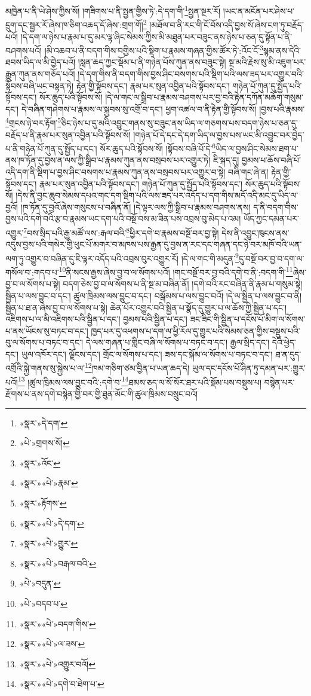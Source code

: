 མཁྱེན་པ་ནི་ཡེ་ཤེས་ཀྱིས་སོ། །གཟིགས་པ་ནི་སྤྱན་གྱིས་ཏེ་:དེ་དག་གི་\footnote{«སྣར་»དེ་དག་}སྤྱན་སྔར་རོ། །ཡང་ན་མངོན་པར་ཤེས་པ་དྲུག་དང་སྦྱར་རོ་ཞེས་ཁ་ཅིག་འཆད་དོ་ཞེས་:གྲག་གོ།\footnote{«པེ་»གྲགས་སོ།} །མཐོལ་བ་ནི་རང་གི་ངོ་བོས་འདི་བྱས་སོ་ཞེས་ངག་ཏུ་བརྗོད་པའོ། །དེ་དག་ལ་ཉེས་པ་རྣམ་པ་དུ་མར་ལྟ་ཞིང་སེམས་ཀྱིས་མི་མཐུན་པར་བཟུང་ནས་ཉེས་པ་ཅན་དུ་སྟོན་པ་ནི་བཤགས་པའོ། །མི་འཆབ་པ་ནི་བདག་གིས་བགྱིས་པའི་སྡིག་པ་རྣམས་གཞན་གྱིས་ཚོར་ཏེ་:འོང་ངོ་\footnote{«སྣར་»འོང་}སྙམ་ནས་དེའི་ཐབས་ཡིད་ལ་མི་བྱེད་པའོ། །སླན་ཆད་ཀྱང་སྡོམ་པ་ནི་གཉེན་པོས་ཀུན་ནས་བཟུང་སྟེ། སྔ་མའི་རྗེས་སུ་མི་འཇུག་པར་རྒྱུན་ཀུན་ནས་གཅོད་པའོ། །དེ་དག་གིས་ནི་བདག་གིས་བྱས་ཤིང་བསགས་པའི་སྡིག་པའི་ལས་ཟད་པར་འགྱུར་བའི་སྟོབས་བཞི་ཡང་བསྟན་ཏེ། རྟེན་གྱི་སྟོབས་དང་། རྣམ་པར་སུན་འབྱིན་པའི་སྟོབས་དང་། གཉེན་པོ་ཀུན་དུ་སྤྱོད་པའི་སྟོབས་དང་། སོར་ཆུད་པའི་སྟོབས་སོ། །དེ་ལ་གང་ལ་སྒྲིབ་པ་རྣམས་བཤགས་པར་བྱ་བའི་རྟེན་དཀོན་མཆོག་གསུམ་དང་། དེ་བཞིན་གཤེགས་པ་རྣམས་ལ་སྐྱབས་སུ་འགྲོ་བ་དང་། ཕྱག་འཚལ་བ་ནི་རྟེན་གྱི་སྟོབས་སོ། །བྱས་པའི་རྣམས་\footnote{«སྣར་»«པེ་»རྣམ་}གྲངས་ཉེ་བར་རྟོག་\footnote{«སྣར་»རྟོགས་}ཅིང་ཉེས་པ་དུ་མའི་འབྱུང་གནས་སུ་བཟུང་ནས་ཡིད་ལ་གཅགས་པས་བདག་ཉེས་པ་ཅན་དུ་བརྗོད་པ་ནི་རྣམ་པར་སུན་འབྱིན་པའི་སྟོབས་སོ། །གཉེན་པོ་དེ་དང་དེ་དག་ཡིད་ལ་བྱས་པས་ཡང་མི་འབྱུང་བར་བྱེད་པ་ནི་གཉེན་པོ་ཀུན་དུ་སྤྱོད་པ་དང་། སོར་ཆུད་པའི་སྟོབས་སོ། །སྟོབས་བཞི་པོ་དེ་\footnote{«སྣར་»«པེ་»དེ་དག་}ཡིད་ལ་བྱས་ཤིང་སེམས་ཐག་པ་ནས་ཁ་ཏོན་དུ་བྱས་ན་ལས་ཀྱི་སྒྲིབ་པ་རྣམས་ཀུན་ནས་བསྲབས་པར་འགྱུར་ཏེ། ཇི་སྐད་དུ། བྱམས་པ་ཆོས་བཞི་པོ་འདི་དག་ནི་སྡིག་པ་བྱས་ཤིང་བསགས་པ་རྣམས་ཀུན་ནས་བསྲབས་པར་འགྱུར་བ་སྟེ། བཞི་གང་ཞེ་ན། རྟེན་གྱི་སྟོབས་དང་། རྣམ་པར་སུན་འབྱིན་པའི་སྟོབས་དང་། གཉེན་པོ་ཀུན་དུ་སྤྱོད་པའི་སྟོབས་དང་། སོར་ཆུད་པའི་སྟོབས་སོ། །དེས་ནི་བྱང་ཆུབ་སེམས་དཔའ་གང་དག་སྡིག་པའི་ལས་ཟད་པར་འདོད་པ་དག་གིས་མདོ་འདི་མང་དུ་ཡིད་ལ་བྱའོ། །ཁ་ཏོན་དུ་བྱའོ་ཞེས་གསུངས་པ་བཞིན་ནོ། །དེ་ལྟར་ལས་ཀྱི་སྒྲིབ་པ་རྣམས་བཤགས་ནས། ད་ནི་བདག་གིས་བྱས་པའི་དགེ་བའི་རྩ་བ་རྣམས་ཡང་དག་པའི་བསྔོ་བས་མ་ཟིན་པས་འབྲས་བུ་མེད་པ་འམ། ཡོད་ཀྱང་དམན་པར་འགྱུར་\footnote{«སྣར་»«པེ་»གྱུར་}བས་སྲིད་པའི་རྒྱ་མཚོ་ལས་:རྒལ་བའི་\footnote{«སྣར་»«པེ་»བརྒལ་བའི་}ཕྱིར་དགེ་བ་རྣམས་བསྔོ་བར་བྱ་སྟེ། དེས་ནི་འབྱུང་ཁུངས་ནས་འདུས་བྱས་པའི་གསེར་གྱི་ཕུང་པོ་མགར་བ་མཁས་པས་རྒྱན་དུ་བྱས་ན་རང་དང་གཞན་དང་ཉེ་བར་མཁོ་བའི་ཡན་ལག་ཏུ་འགྱུར་བ་བཞིན་དུ་ཇི་ལྟར་འདོད་པའི་འབྲས་བུར་འགྱུར་རོ། །དེ་ལ་གང་གི་མདུན་\footnote{«པེ་»བདུན་}དུ་བསྔོ་བར་བྱ་བ་དག་ལ་གསོལ་བ་:གདབ་པ་\footnote{«པེ་»བདབ་པ་}ནི་སངས་རྒྱས་ཞེས་བྱ་བ་ལ་སོགས་པའོ། །གང་བསྔོ་བར་བྱ་བའི་དགེ་བ་ནི་:བདག་གི་\footnote{«སྣར་»«པེ་»བདག་གིས་}ཞེས་བྱ་བ་ལ་སོགས་པ་སྟེ། བདག་ཅེས་བྱ་བ་ལ་སོགས་པ་ནི་སྔ་མ་བཞིན་ནོ། །དགེ་བའི་རང་བཞིན་ནི་རྣམ་པ་གསུམ་སྟེ། སྦྱིན་པ་ལས་བྱུང་བ་དང་། ཚུལ་ཁྲིམས་ལས་བྱུང་བ་དང་། བསྒོམས་པ་ལས་བྱུང་བའོ། །དེ་ལ་སྦྱིན་པ་ལས་བྱུང་བ་ནི། སྦྱིན་པ་ཐ་ན་ཞེས་བྱ་བ་ལ་སོགས་པ་སྟེ། ཆེན་པོར་འགྱུར་བའི་སྦྱིན་པ་སྣོད་དུ་གྱུར་པ་ལ་ཆོས་ཀྱི་སྦྱིན་པ་དང་། འཇིགས་པ་ལ་མི་འཇིགས་པའི་སྦྱིན་པ་དང་། བྱམས་པའི་སྦྱིན་པ་དང་། ཟང་ཟིང་གི་སྦྱིན་པ་དངོས་པོ་མིག་ལ་སོགས་པ་ནས་ཡོངས་སུ་བཏང་བ་དང་། ཁྱད་པར་དུ་འཕགས་པ་དག་ལ་ཕྱི་རོལ་དུ་གྱུར་པའི་སེམས་ཅན་གྱིས་བསྡུས་པའི་བུ་ལ་སོགས་པ་བཏང་བ་དང་། དེ་ལས་གཞན་པ་གླིང་བཞི་ལ་སོགས་པ་བཏང་བ་དང་། རྒྱལ་སྲིད་དང་། དེའི་ཕྱེད་དང་། ཡུལ་འཁོར་དང་། ལྗོངས་དང་། གྲོང་ལ་སོགས་པ་དང་། ཟས་དང་སྐོམ་ལ་སོགས་པ་བཏང་བ་དང་། ཐ་ན་དུད་འགྲོའི་སྐྱེ་གནས་སུ་སྐྱེས་པ་ལ་\footnote{«སྣར་»«པེ་»ལ་ཟས་}ཁམ་གཅིག་ཙམ་བྱིན་པ་ཡན་ཆད་དེ། ཡུལ་དང་དངོས་པོ་ཤིན་ཏུ་དམན་པར་:གྱུར་པའོ།\footnote{«སྣར་»«པེ་»འགྱུར་བའོ།} །ཚུལ་ཁྲིམས་ལས་བྱུང་བའི་:དགེ་བ་\footnote{«སྣར་»«པེ་»དགེ་བ་ཐེག་པ་}ཐམས་ཅད་ལ་སོ་སོར་ཐར་པའི་སྡོམ་པས་བསྡུས་པ། བསྙེན་པར་རྫོགས་པ་ནས་དགེ་བསྙེན་གྱི་བར་གྱི་ཐུན་མོང་གི་ཚུལ་ཁྲིམས་བསྲུང་བའོ། 
